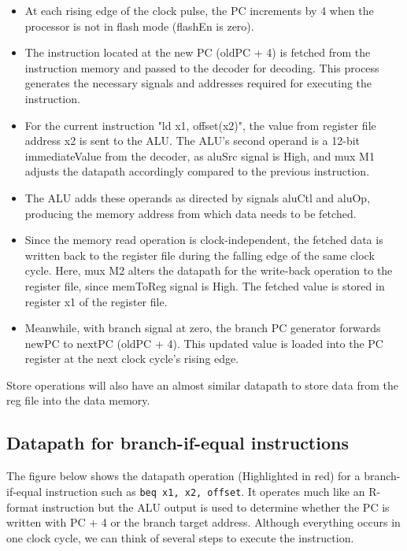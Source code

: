 \begin{itemize}
  \item At each rising edge of the clock pulse, the PC increments by 4 when the processor is not in flash mode (flashEn is zero).
  \item The instruction located at the new PC (oldPC + 4) is fetched from the instruction memory and passed to the decoder for decoding. This process generates the necessary signals and addresses required for executing the instruction.

  \item For the current instruction "ld x1, offset(x2)", the value from register file address x2 is sent to the ALU. The ALU's second operand is a 12-bit immediateValue from the decoder, as aluSrc signal is High, and mux M1 adjusts the datapath accordingly compared to the previous instruction.

  \item The ALU adds these operands as directed by signals aluCtl and aluOp, producing the memory address from which data needs to be fetched.

  \item Since the memory read operation is clock-independent, the fetched data is written back to the register file during the falling edge of the same clock cycle. Here, mux M2 alters the datapath for the write-back operation to the register file, since memToReg signal is High. The fetched value is stored in register x1 of the register file.

  \item Meanwhile, with branch signal at zero, the branch PC generator forwards newPC to nextPC (oldPC + 4). This updated value is loaded into the PC register at the next clock cycle's rising edge.
\end{itemize}

Store operations will also have an almost similar datapath to store data from the reg file into the data memory.

\subsection{Datapath for branch-if-equal instructions}

The figure below shows the datapath operation (Highlighted in red) for a branch-if-equal instruction such as \texttt{beq x1, x2, offset}. It operates much like an R-format instruction but the ALU output is used to determine whether the PC is written with PC + 4 or the branch target address. Although everything occurs in one clock cycle, we can think of several steps to execute the instruction.


